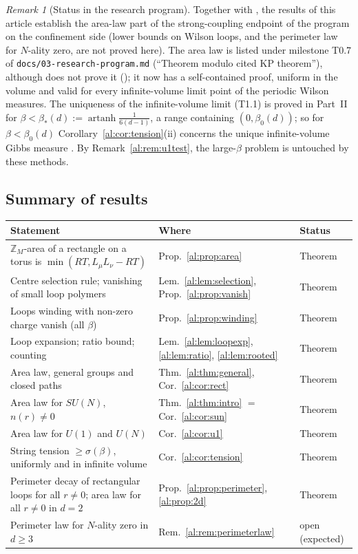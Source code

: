 \documentclass[11pt,a4paper]{article}
\theoremstyle{definition}
\theoremstyle{remark}
\newtheorem{remark}[theorem]{Remark}
\DeclareMathOperator{\artanh}{artanh}
\newcommand{\Z}{\mathbb{Z}}
\newcommand{\Fref}[3]{\cite[#1~`#2' (\texttt{#3})]{F}}
\newcommand{\Flab}[2]{\cite[#1 \texttt{#2}]{F}}
\begin{document}
\begin{remark}[Status in the research program]
Together with \Fref{Theorem}{Strong-coupling clustering and mass gap, uniform in the volume}{thm:strong}, the results of
this article establish the area-law part of the strong-coupling endpoint of the program on the confinement side (lower
bounds on Wilson loops, and the perimeter law for $N$-ality zero, are not proved here). The area law is listed under
milestone T0.7 of \texttt{docs/03-research-program.md} (``Theorem modulo cited KP theorem''), although \cite{F} does not
prove it (\Flab{Remark}{rem:further}); it now has a self-contained proof, uniform in the volume and valid for every
infinite-volume limit point of the periodic Wilson measures. The uniqueness of the infinite-volume limit (T1.1) is proved in
Part~II \cite{II} for $\beta<\beta_*(d):=\artanh\frac1{6(d-1)}$, a range containing $(0,\beta_0(d))$; so for $\beta<\beta_0(d)$
Corollary~\ref{al:cor:tension}(ii) concerns the unique infinite-volume Gibbs measure \cite[Corollary~`Area law in infinite
volume']{II}. By Remark~\ref{al:rem:u1test}, the large-$\beta$ problem is untouched by
these methods.
\end{remark}

\subsection*{Summary of results}

\begin{center}
\small
\begin{tabular}{@{}p{}p{}l@{}}
\toprule
Statement & Where & Status\\
\midrule
$\Z_M$-area of a rectangle on a torus is $\min(RT,L_\mu L_\nu-RT)$ & Prop.~\ref{al:prop:area} & Theorem\\
Centre selection rule; vanishing of small loop polymers & Lem.~\ref{al:lem:selection}, Prop.~\ref{al:prop:vanish} & Theorem\\
Loops winding with non-zero charge vanish (all $\beta$) & Prop.~\ref{al:prop:winding} & Theorem\\
Loop expansion; ratio bound; counting & Lem.~\ref{al:lem:loopexp}, \ref{al:lem:ratio}, \ref{al:lem:rooted} & Theorem\\
Area law, general groups and closed paths & Thm.~\ref{al:thm:general}, Cor.~\ref{al:cor:rect} & Theorem\\
Area law for $SU(N)$, $n(r)\neq0$ & Thm.~\ref{al:thm:intro} $=$ Cor.~\ref{al:cor:sun} & Theorem\\
Area law for $U(1)$ and $U(N)$ & Cor.~\ref{al:cor:u1} & Theorem\\
String tension $\ge\sigma(\beta)$, uniformly and in infinite volume & Cor.~\ref{al:cor:tension} & Theorem\\
Perimeter decay of rectangular loops for all $r\neq0$; area law for all $r\neq0$ in $d=2$ & Prop.~\ref{al:prop:perimeter}, \ref{al:prop:2d} & Theorem\\
Perimeter law for $N$-ality zero in $d\ge3$ & Rem.~\ref{al:rem:perimeterlaw} & open (expected)\\
\bottomrule
\end{tabular}
\end{center}
\end{document}
